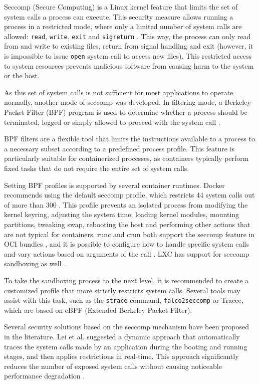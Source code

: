 Seccomp (Secure Computing) is a Linux kernel feature that limits the set of system calls a process can execute. This security measure allows running a process in a restricted mode, where only a limited number of system calls are allowed: \texttt{read}, \texttt{write}, \texttt{exit} and \texttt{sigreturn} \cite{m:seccomp}. This way, the process can only read from and write to existing files, return from signal handling and exit (however, it is impossible to issue \texttt{open} system call to access new files). This restricted access to system resources prevents malicious software from causing harm to the system or the host.

As this set of system calls is not sufficient for most applications to operate normally, another mode of seccomp was developed. In filtering mode, a Berkeley Packet Filter (BPF) program is used to determine whether a process should be terminated, logged or simply allowed to proceed with the system call \cite{d:kernelseccomp}.

BPF filters are a flexible tool that limits the instructions available to a process to a necessary subset according to a predefined process profile. This feature is particularly suitable for containerized processes, as containers typically perform fixed tasks that do not require the entire set of system calls.

Setting BPF profiles is supported by several container runtimes. Docker recommends using the default seccomp profile, which restricts 44 system calls out of more than 300 \cite{d:dockerseccomp}. This profile prevents an isolated process from modifying the kernel keyring, adjusting the system time, loading kernel modules, mounting partitions, tweaking swap, rebooting the host and performing other actions that are not typical for containers. runc and crun both support the seccomp feature in OCI bundles \cite{d:ocilinux}, and it is possible to configure how to handle specific system calls and vary actions based on arguments of the call \cite{s:lxcseccomp}. LXC has support for seccomp sandboxing as well \cite{s:what-is-selinux}.

To take the sandboxing process to the next level, it is recommended to create a customized profile that more strictly restricts system calls. Several tools may assist with this task, such as the \texttt{strace} command, \texttt{falco2seccomp} or Tracee, which are based on eBPF (Extended Berkeley Packet Filter).

Several security solutions based on the seccomp mechanism have been proposed in the literature. Lei et al. suggested a dynamic approach that automatically traces the system calls made by an application during the booting and running stages, and then applies restrictions in real-time. This approach significantly reduces the number of exposed system calls without causing noticeable performance degradation \cite{spr:2}.

